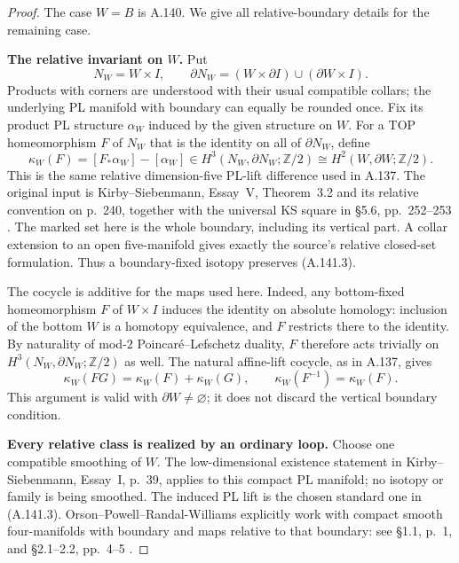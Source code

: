 \begin{proof}
The case $W=B$ is A.140. We give all relative-boundary details
for the remaining case.

\textbf{The relative invariant on $W$.}
Put
\[
 N_W=W\times I,
 \qquad
 \partial N_W=(W\times\partial I)\cup(\partial W\times I).
\]
Products with corners are understood with their usual compatible
collars; the underlying PL manifold with boundary can equally be
rounded once. Fix its product PL structure $\alpha_W$ induced
by the given structure on $W$. For a TOP homeomorphism $F$ of
$N_W$ that is the identity on all of $\partial N_W$, define
\[
 \kappa_W(F)=[F_*\alpha_W]-[\alpha_W]
       \in H^3(N_W,\partial N_W;\mathbb Z/2)
       \cong H^2(W,\partial W;\mathbb Z/2).           \tag{A.141.3}
\]
This is the same relative dimension-five PL-lift difference
used in A.137. The original input is Kirby--Siebenmann,
Essay~V, Theorem~3.2 and its relative convention on p.~240,
together with the universal KS square in \S5.6,
pp.~252--253 \cite{KirbySiebenmann1977}. The marked set here
is the whole boundary, including its vertical part. A collar
extension to an open five-manifold gives exactly the source's
relative closed-set formulation. Thus a boundary-fixed isotopy
preserves (A.141.3).

The cocycle is additive for the maps used here. Indeed, any
bottom-fixed homeomorphism $F$ of $W\times I$ induces the
identity on absolute homology: inclusion of the bottom $W$
is a homotopy equivalence, and $F$ restricts there to the
identity. By naturality of mod-$2$ Poincar\'e--Lefschetz
duality, $F$ therefore acts trivially on
$H^3(N_W,\partial N_W;\mathbb Z/2)$ as well.
The natural affine-lift cocycle, as in A.137, gives
\[
 \kappa_W(FG)=\kappa_W(F)+\kappa_W(G),
 \qquad \kappa_W(F^{-1})=\kappa_W(F).                 \tag{A.141.4}
\]
This argument is valid with $\partial W\ne\varnothing$;
it does not discard the vertical boundary condition.

\textbf{Every relative class is realized by an ordinary loop.}
Choose one compatible smoothing of $W$. The low-dimensional
existence statement in Kirby--Siebenmann, Essay~I, p.~39,
applies to this compact PL manifold; no isotopy or family is
being smoothed. The induced PL lift is the chosen standard
one in (A.141.3).
Orson--Powell--Randal-Williams explicitly work with compact
smooth four-manifolds with boundary and maps relative to that
boundary: see \S1.1, p.~1, and \S2.1--2.2, pp.~4--5
\cite{OrsonPowellRandalWilliams2026}.


\end{proof}
